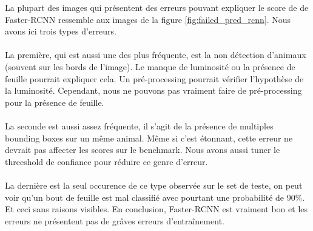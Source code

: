 La plupart des images qui présentent des erreurs pouvant expliquer le score de de Faster-RCNN ressemble aux images de la figure \ref{fig:failed_pred_rcnn}. 
Nous avons ici trois types d'erreurs. 
\paragraph{}
La première, qui est aussi une des plus fréquente, est la non détection d'animaux (souvent sur les bords de l'image). Le manque de luminosité ou la présence de feuille pourrait expliquer cela. Un pré-processing pourrait vérifier l'hypothèse de la luminosité. Cependant, nous ne pouvons pas vraiment faire de pré-processing pour la présence de feuille.
\paragraph{}
La seconde est aussi assez fréquente, il s'agit de la présence de multiples bounding boxes sur un même animal. Même si c'est étonnant, cette erreur ne devrait pas affecter les scores sur le benchmark. Nous avons aussi tuner le threeshold de confiance pour réduire ce genre d'erreur.
\paragraph{}
La dernière est la seul occurence de ce type observée sur le set de teste, on peut voir qu'un bout de feuille est mal classifié avec pourtant une probabilité de 90\%. Et ceci sans raisons visibles.
En conclusion, Faster-RCNN est vraiment bon et les erreurs ne présentent pas de grâves erreurs d'entraînement.

